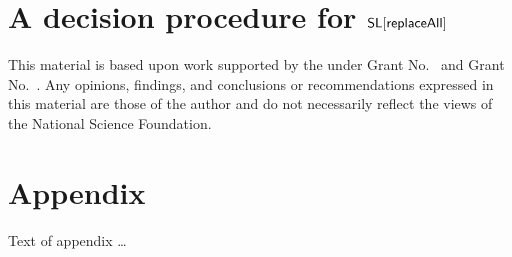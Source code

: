 \documentclass[sigplan,10pt,review,anonymous]{acmart}\settopmatter{printfolios=true}
\begin{document}
\section{A decision procedure for $\mathsf{SL}[\mathsf{replaceAll}]$}



 
 
 
 
 
 
 
 
 

\begin{acks}                            %
  This material is based upon work supported by the
   under Grant
  No.~ and Grant
  No.~.  Any opinions, findings, and
  conclusions or recommendations expressed in this material are those
  of the author and do not necessarily reflect the views of the
  National Science Foundation.
\end{acks}


%


\appendix
\section{Appendix}

Text of appendix \ldots
\end{document}
